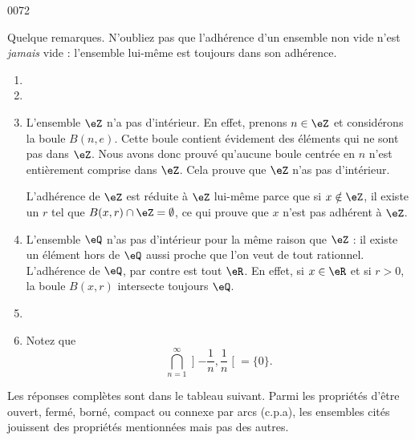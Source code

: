 
\begin{corrige}{0072}

Quelque remarques. N'oubliez pas que l'adhérence d'un ensemble non vide n'est \emph{jamais} vide : l'ensemble lui-même est toujours dans son adhérence.
\begin{enumerate}

\item
\item
\item
L'ensemble $\eZ$ n'a pas d'intérieur. En effet, prenons $n\in\eZ$ et considérons la boule $B(n,e)$. Cette boule contient évidement des éléments qui ne sont pas dans $\eZ$. Nous avons donc prouvé qu'aucune boule centrée en $n$ n'est entièrement comprise dans $\eZ$. Cela prouve que $\eZ$ n'as pas d'intérieur.

L'adhérence de $\eZ$ est réduite à $\eZ$ lui-même parce que si $x\notin\eZ$, il existe un $r$ tel que $B(x,r)\cap\eZ=\emptyset$, ce qui prouve que $x$ n'est pas adhérent à $\eZ$.

\item
L'ensemble $\eQ$ n'as pas d'intérieur pour la même raison que $\eZ$ : il existe un élément hors de $\eQ$ aussi proche que l'on veut de tout rationnel. L'adhérence de $\eQ$, par contre est tout $\eR$. En effet, si $x\in\eR$ et si $r>0$, la boule $B(x,r)$ intersecte toujours $\eQ$.
\item
\item
Notez que
\begin{equation}
	\bigcap_{n=1}^{\infty}\mathopen]-\frac{1}{ n },\frac{1}{ n }\mathclose[=\{ 0 \}.
\end{equation}
\end{enumerate}

Les réponses complètes sont dans le tableau suivant. Parmi les propriétés d'être ouvert, fermé, borné, compact ou connexe par arcs (c.p.a), les ensembles cités jouissent des propriétés mentionnées mais pas des autres.


\end{corrige}
